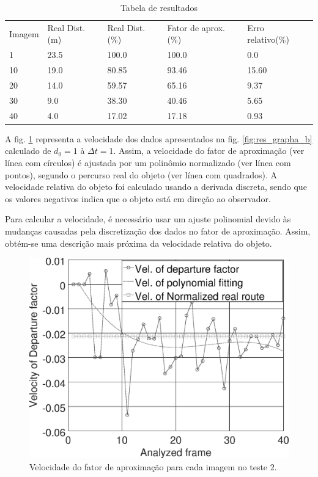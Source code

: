 \begin{table}[H]
\setlength{\tabcolsep}{1 pt} 
\caption{Tabela de resultados}
\begin{tabular}{lllll}
Imagem & Real Dist.(m) & Real Dist.(\%) & Fator de aprox.(\%) & Erro relativo(\%)\\
1 & 23.5 & 100.0 & 100.0 & 0.0 \\
10 & 19.0 & 80.85 & 93.46 & 15.60 \\
20 & 14.0 & 59.57 & 65.16 & 9.37 \\
30 & 9.0 & 38.30 & 40.46 & 5.65 \\
40 & 4.0 & 17.02 & 17.18 & 0.93
\end{tabular}
\label{tab:tab1}
\end{table}

A fig. \ref{fig:res_grapha_bv} representa a velocidade dos dados apresentados 
na fig. \ref{fig:res_grapha_b} calculado de $d_0=1$ à $\Delta t=1$.
Assim, a velocidade do fator de aproximação (ver línea com círculos) é ajustada por um polinômio
normalizado (ver línea com pontos), segundo o percurso real do objeto (ver línea com quadrados).
A velocidade relativa do objeto foi calculado usando a derivada
discreta, sendo que os valores negativos indica que o objeto está
em direção ao observador.

Para calcular a velocidade, é necessário usar um ajuste polinomial devido 
às mudanças causadas pela discretização dos dados no fator de aproximação.
Assim, obtém-se uma descrição mais próxima da velocidade relativa do 
objeto.

\begin{figure}[H]
\includegraphics[width=\columnwidth]{images/graphvelocity.eps}
\caption{Velocidade do fator de aproximação para cada imagem no teste 2.}
\label{fig:res_grapha_bv}
\end{figure}